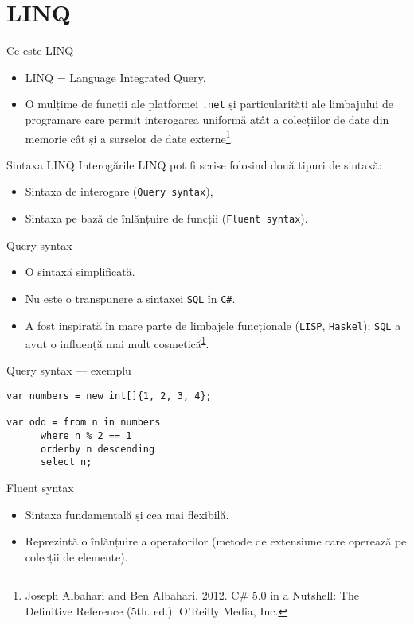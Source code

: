 \documentclass[presentation]{beamer}
\begin{document}
\section{LINQ}
\label{sec:org0f7573d}
\begin{frame}[label={sec:org9f0642c},fragile]{Ce este LINQ}
 \begin{itemize}
\item LINQ = Language Integrated Query.
\item O mulțime de funcții ale platformei \texttt{.net} și particularități ale limbajului de programare care permit interogarea uniformă atât a colecțiilor de date din memorie cât și a surselor de date externe\footnote{Joseph Albahari and Ben Albahari. 2012. C\# 5.0 in a Nutshell: The Definitive Reference (5th. ed.). O’Reilly Media, Inc.\label{org0ec79a7}}.
\end{itemize}
\end{frame}
\begin{frame}[label={sec:org1d829bc},fragile]{Sintaxa LINQ}
 Interogările LINQ pot fi scrise folosind două tipuri de sintaxă:
\begin{itemize}
\item Sintaxa de interogare (\texttt{Query syntax}),
\item Sintaxa pe bază de înlănțuire de funcții (\texttt{Fluent syntax}).
\end{itemize}
\end{frame}
\begin{frame}[label={sec:orgce01196},fragile]{Query syntax}
 \begin{itemize}
\item O sintaxă simplificată.
\item \alert{Nu} este o transpunere a sintaxei \texttt{SQL} în \texttt{C\#}.
\item A fost inspirată în mare parte de limbajele funcționale (\texttt{LISP}, \texttt{Haskel}); \texttt{SQL} a avut o influență mai mult cosmetică\textsuperscript{\ref{org0ec79a7}}.
\end{itemize}
\end{frame}
\begin{frame}[label={sec:org15c7031},fragile]{Query syntax --- exemplu}
 \begin{verbatim}
var numbers = new int[]{1, 2, 3, 4};

var odd = from n in numbers
	  where n % 2 == 1
	  orderby n descending
	  select n;
\end{verbatim}
\end{frame}
\begin{frame}[label={sec:orgce5348a}]{Fluent syntax}
\begin{itemize}
\item Sintaxa fundamentală și cea mai flexibilă.
\item Reprezintă o înlănțuire a operatorilor (metode de extensiune care operează pe colecții de elemente).
\end{itemize}
\end{frame}
\end{document}
